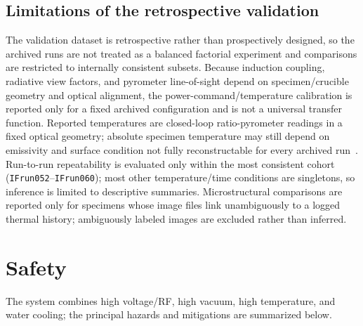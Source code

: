 \documentclass[5p,times]{elsarticle}
\begin{document}
\subsection{Limitations of the retrospective validation}

The validation dataset is retrospective rather than prospectively designed, so the
archived runs are not treated as a balanced factorial experiment and comparisons are
restricted to internally consistent subsets. Because induction coupling, radiative view
factors, and pyrometer line-of-sight depend on specimen/crucible geometry and optical
alignment, the power-command/temperature calibration is reported only for a fixed
archived configuration and is not a universal transfer function. Reported temperatures
are closed-loop ratio-pyrometer readings in a fixed optical geometry; absolute specimen
temperature may still depend on emissivity and surface condition not fully
reconstructable for every archived run~\cite{ham2016insituspectralemissivity,suleiman2025improvingpyrometryof}.
Run-to-run repeatability is evaluated only within the most consistent cohort
(\texttt{IFrun052}--\texttt{IFrun060}); most other temperature/time conditions are
singletons, so inference is limited to descriptive summaries. Microstructural
comparisons are reported only for specimens whose image files link unambiguously to a
logged thermal history; ambiguously labeled images are excluded rather than inferred.

\section{Safety}

The system combines high voltage/RF, high vacuum, high temperature, and water
cooling; the principal hazards and mitigations are summarized below.
\end{document}
